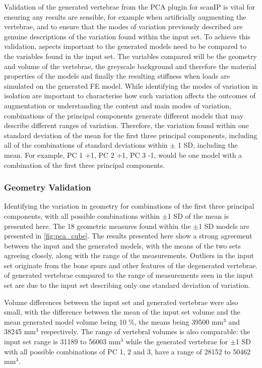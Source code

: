 Validation of the generated vertebrae from the PCA plugin for scanIP is vital
for ensuring any results are sensible, for example when artificially augmenting
the vertebrae, and to ensure that the modes of variation previously described
are genuine descriptions of the variation found within the input set.  To
achieve this validation, aspects important to the generated models need to be
compared to the variables found in the input set.  The variables compared will
be the geometry and volume of the vertebrae, the greyscale background and
therefore the material properties of the models and finally the resulting
stiffness when loads are simulated on the generated FE model.  While
identifying the modes of variation in isolation are important to characterise
how such variation affects the outcomes of augmentation or understanding the
content and main modes of variation, combinations of the principal components
generate different models that may describe different ranges of variation.
Therefore, the variation found within one standard deviation of the mean for
the first three principal components, including all of the combinations of
standard deviations within $\pm$ 1 SD, including the mean.  For example, PC 1
+1, PC 2 +1, PC 3 -1, would be one model with a combination of the first three
principal components.

\subsubsection{Geometry Validation}

Identifying the variation in geometry for combinations of the first three
principal components, with all possible combinations within $\pm$1 SD of the
mean is presented here.  The 18 geometric measures found within the $\pm$1 SD
models are presented in \cref{fig:pca_cube}.  The results presented here show a
strong agreement between the input and the generated models, with the means of
the two sets agreeing closely, along with the range of the measurements.
Outliers in the input set originate from the bone spurs and other features of
the degenerated vertebrae. %
of generated vertebrae compared to the range of measurements seen in the input
set are due to the input set describing only one standard deviation of
variation.

Volume differences between the input set and generated vertebrae were also
small, with the difference between the mean of the input set volume and the
mean generated model volume being 10 \%, the means being 39500 mm$^3$ and 38245
mm$^3$ respectively.  The range of vertebral volumes is also comparable: the
input set range is 31189 to 56003 mm$^3$ while the generated vertebrae for
$\pm$1 SD with all possible combinations of PC 1, 2 and 3, have a range of
28152 to 50462 mm$^3$.

